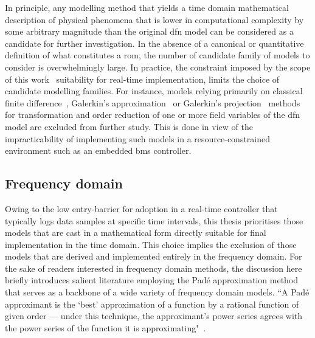 In  principle, any  modelling  method  that yields  a  time domain  mathematical
description  of physical  phenomena that  is lower  in computational  complexity
by  some  arbitrary   magnitude  than  the  original  \gls{dfn}   model  can  be
considered  as  a  candidate  for  further  investigation.  In  the  absence  of
a  canonical  or  quantitative  definition  of  what  constitutes  a  \gls{rom},
the  number  of  candidate  family  of  models  to  consider  is  overwhelmingly
large.  In  practice,  the  constraint  imposed   by  the  scope  of  this  work
\ie~suitability  for real-time  implementation, limits  the choice  of candidate
modelling  families.  For  instance,   models  relying  primarily  on  classical
finite  difference~\cite{Smith2006}, Galerkin's  approximation~\cite{Dao2012} or
Galerkin's  projection~\cite{Fan2016,Fan2018}  methods  for  transformation  and
order  reduction of  one or  more  field variables  of the  \gls{dfn} model  are
excluded from  further study. This  is done in  view of the  impracticability of
implementing  such  models in  a  resource-constrained  environment such  as  an
embedded \gls{bms} controller.

\subsection{Frequency   domain   }\label{subsec:freqdomainroms}

Owing  to the  low entry-barrier  for adoption  in a  real-time controller  that
typically logs data samples at  specific time intervals, this thesis prioritises
those models  that are cast in  a mathematical form directly  suitable for final
implementation in  the time domain. This  choice implies the exclusion  of those
models that  are derived and implemented  entirely in the frequency  domain. For
the sake of readers interested in  frequency domain methods, the discussion here
briefly introduces  salient literature  employing the Padé  approximation method
that serves as a backbone of a wide variety of frequency domain models. ``A Padé
approximant is the `best' approximation of a function by a rational function of
given order --- under this technique, the approximant's power series agrees with
the power series of the function it is approximating"~\cite{padewiki}.


